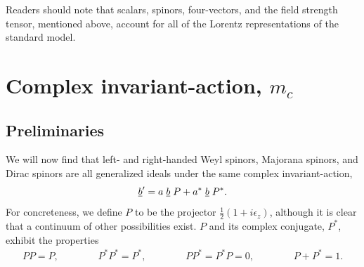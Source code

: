 \documentclass[letterpaper,12pt,titlepage,oneside,final]{book}
\begin{document}

\noindent Readers should note that scalars, spinors, four-vectors, and the field strength tensor, mentioned above, account for all of the Lorentz representations of the standard model.


\section{Complex invariant-action, $m_c$\label{mc}  }

\subsection{Preliminaries  }


We will now find that left- and right-handed Weyl spinors, Majorana spinors, and Dirac spinors are all generalized ideals under the same complex invariant-action, 
\begin{equation}\label{cma}
\underline{b}' =  a\hspace{1mm}\underline{b}\hspace{1mm} P + a^*\hspace{1mm}\underline{b}\hspace{1mm} P^*.  
\end{equation}
\noindent For concreteness, we define $P$ to be the projector $\frac{1}{2}\left(1+i{\epsilon_z}\right)$, although it is  clear that a continuum of other possibilities exist.  $P$ and its complex conjugate, $P^*$, exhibit the properties 
\begin{equation}\begin{array}{lllllll}
PP=P,  & \hspace{1cm} & P^*P^* = P^*, & \hspace{1cm} & PP^* = P^*P = 0,  & \hspace{1cm} & P + P^* = 1.
\end{array}\end{equation}
\end{document}
